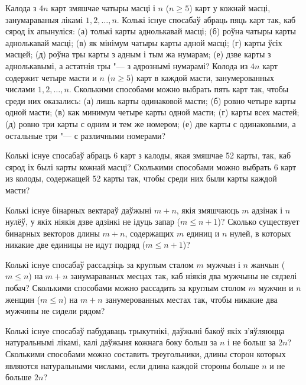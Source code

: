 \begin{problemList}
\bigskip

\problemItemSimple
{Калода з $4n$ карт змяшчае чатыры масці і $n$ ($n \ge 5$) карт у кожнай масці,
занумараваныя лікамі $1, 2, \ldots, n$. Колькі існуе спосабаў абраць пяць карт так,
каб сярод іх апынуліся: (а) толькі карты аднолькавай масці; (б) роўна чатыры карты
аднолькавай масці; (в) як мінімум чатыры карты адной масці; (г) карты ўсіх масцей;
(д) роўна тры карты з адным і тым жа нумарам; (е) дзве карты з аднолькавымі, а астатнія тры "---
з адрознымі нумарамі?}
{Колода из $4n$ карт содержит четыре масти и $n$ ($n \ge 5$) карт в
каждой масти, занумерованных числами $1, 2, \ldots, n$. Сколькими
способами можно выбрать пять карт так, чтобы среди них оказались: (а)
лишь карты одинаковой масти; (б) ровно четыре карты одной масти; (в)
как минимум четыре карты одной масти; (г) карты всех мастей; (д) ровно
три карты с одним и тем же номером; (е) две карты с одинаковыми, а
остальные три "--- с различными номерами?}

\bigskip

\problemItemSimple
{Колькі існуе спосабаў абраць 6 карт з калоды, якая змяшчае 52 карты, так,
каб сярод іх былі карты кожнай масці?}
{Сколькими способами можно выбрать 6 карт из колоды, содержащей 52
карты так, чтобы среди них были карты каждой масти?}

\bigskip

\problemItemSimple
{Колькі існуе бінарных вектараў даўжыні $m + n$, якія змяшчаюць $m$ адзінак і
$n$ нулёў, у якіх ніякія дзве адзінкі не ідуць запар ($m \le n + 1$)?}
{Сколько существует бинарных векторов длины $m + n$, содержащих $m$
единиц и $n$ нулей, в которых никакие две единицы не идут подряд
($m \le n + 1$)?}

\bigskip

\problemItemSimple
{Колькі існуе спосабаў рассадзіць за круглым сталом $m$ мужчын і $n$ жанчын
($m \le n$) на $m + n$ занумараваных месцах так, каб ніякія два мужчыны не сядзелі побач?}
{Сколькими способами можно рассадить за круглым столом $m$ мужчин и $n$
женщин ($m \le n$) на $m + n$ занумерованных местах так, чтобы никакие
два мужчины не сидели рядом?}

\bigskip

\problemItemSimple
{Колькі існуе спосабаў пабудаваць трыкутнікі, даўжыні бакоў якіх з'яўляюцца натуральнымі лікамі,
калі даўжыня кожнага боку больш за $n$ і не больш за $2n$?}
{Сколькими способами можно составить треугольники, длины сторон которых
являются натуральными числами, если длина каждой стороны больше $n$ и
не больше $2n$?}


\end{problemList}
